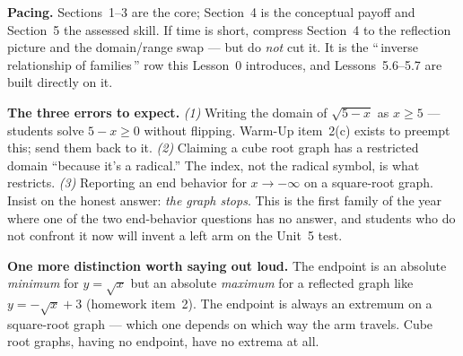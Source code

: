 \documentclass[10pt]{article}
\begin{document}
\begin{teachernote}
\textbf{Pacing.} Sections~1--3 are the core; Section~4 is the conceptual payoff and Section~5 the
assessed skill. If time is short, compress Section~4 to the reflection picture and the domain/range
swap --- but do \emph{not} cut it. It is the ``\,inverse relationship of families\,'' row this
Lesson~0 introduces, and Lessons~5.6--5.7 are built directly on it.

\textbf{The three errors to expect.} \emph{(1)} Writing the domain of $\sqrt{5-x}$ as $x\ge 5$ ---
students solve $5-x\ge0$ without flipping. Warm-Up item~2(c) exists to preempt this; send them back
to it. \emph{(2)} Claiming a cube root graph has a restricted domain ``because it's a radical.'' The
index, not the radical symbol, is what restricts. \emph{(3)} Reporting an end behavior for
$x\to-\infty$ on a square-root graph. Insist on the honest answer: \emph{the graph stops}. This is
the first family of the year where one of the two end-behavior questions has no answer, and students
who do not confront it now will invent a left arm on the Unit~5 test.

\textbf{One more distinction worth saying out loud.} The endpoint is an absolute \emph{minimum} for
$y=\sqrt{x}$ but an absolute \emph{maximum} for a reflected graph like $y=-\sqrt{x}+3$ (homework
item~2). The endpoint is always an extremum on a square-root graph --- which one depends on which way
the arm travels. Cube root graphs, having no endpoint, have no extrema at all.
\end{teachernote}
\end{document}
